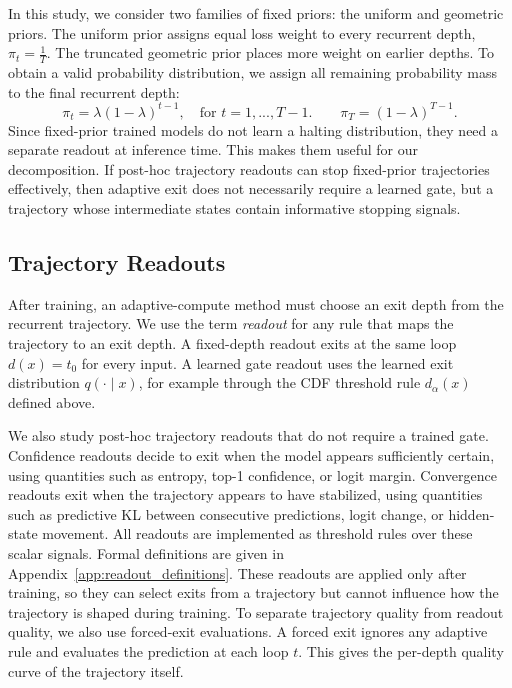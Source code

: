 \documentclass[10pt]{article} %
\begin{document}
In this study, we consider two families of fixed priors: the uniform and geometric priors. The uniform prior assigns equal loss weight to every recurrent depth, \( \pi_t=\frac{1}{T}. \)
The truncated geometric prior places more weight on earlier depths. To obtain a valid probability distribution, we assign all remaining probability mass to the final recurrent depth:
\[ \pi_t=\lambda(1-\lambda)^{t-1}, \quad \text{for }t= 1,...,T-1. \qquad \pi_T=(1-\lambda)^{T-1}. \]
Since fixed-prior trained models do not learn a halting distribution, they need a separate readout at inference time. This makes them useful for our decomposition. If post-hoc trajectory readouts can stop fixed-prior trajectories effectively, then adaptive exit does not necessarily require a learned gate, but a trajectory whose intermediate states contain informative stopping signals.
\subsection{Trajectory Readouts}
\label{sec:trajectory_readout}
After training, an adaptive-compute method must choose an exit depth from the recurrent trajectory. We use the term \emph{readout} for any rule that maps the trajectory to an exit depth. A fixed-depth readout exits at the same loop \(d(x)=t_0\) for every input. A learned gate readout uses the learned exit distribution \(q(\cdot\mid x)\), for example through the CDF threshold rule \(d_\alpha(x)\) defined above.

We also study post-hoc trajectory readouts that do not require a trained gate. Confidence readouts decide to exit when the model appears sufficiently certain, using quantities such as entropy, top-1 confidence, or logit margin. Convergence readouts exit when the trajectory appears to have stabilized, using quantities such as predictive KL between consecutive predictions, logit change, or hidden-state movement. All readouts are implemented as threshold rules over these scalar signals. Formal definitions are given in Appendix~\ref{app:readout_definitions}. These readouts are applied only after training, so they can select exits from a trajectory but cannot influence how the trajectory is shaped during training. To separate trajectory quality from readout quality, we also use forced-exit evaluations. A forced exit ignores any adaptive rule and evaluates the prediction at each loop \(t\). This gives the per-depth quality curve of the trajectory itself.
\end{document}
